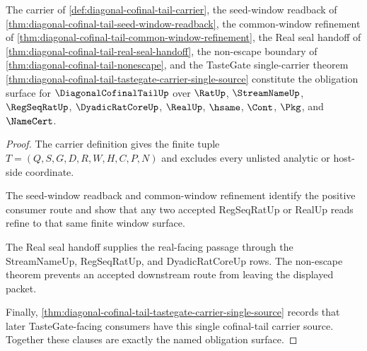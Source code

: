 \begin{theorem}
\label{thm:diagonal-cofinal-tail-obligation-closure-package}
The carrier of \autoref{def:diagonal-cofinal-tail-carrier}, the seed-window readback of \autoref{thm:diagonal-cofinal-tail-seed-window-readback}, the common-window refinement of \autoref{thm:diagonal-cofinal-tail-common-window-refinement}, the Real seal handoff of \autoref{thm:diagonal-cofinal-tail-real-seal-handoff}, the non-escape boundary of \autoref{thm:diagonal-cofinal-tail-nonescape}, and the TasteGate single-carrier theorem \autoref{thm:diagonal-cofinal-tail-tastegate-carrier-single-source} constitute the obligation surface for $\DiagonalCofinalTailUp$ over $\RatUp$, $\StreamNameUp$, $\RegSeqRatUp$, $\DyadicRatCoreUp$, $\RealUp$, $\hsame$, $\Cont$, $\Pkg$, and $\NameCert$.
\end{theorem}
\begin{proof}
The carrier definition gives the finite tuple $T=(Q,S,G,D,R,W,H,C,P,N)$ and excludes every unlisted analytic or host-side coordinate.

The seed-window readback and common-window refinement identify the positive consumer route and show that any two accepted RegSeqRatUp or RealUp reads refine to that same finite window surface.

The Real seal handoff supplies the real-facing passage through the StreamNameUp, RegSeqRatUp, and DyadicRatCoreUp rows. The non-escape theorem prevents an accepted downstream route from leaving the displayed packet.

Finally, \autoref{thm:diagonal-cofinal-tail-tastegate-carrier-single-source} records that later TasteGate-facing consumers have this single cofinal-tail carrier source. Together these clauses are exactly the named obligation surface.
\end{proof}

